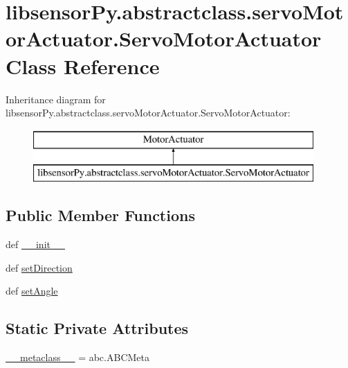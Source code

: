 \hypertarget{classlibsensorPy_1_1abstractclass_1_1servoMotorActuator_1_1ServoMotorActuator}{}\section{libsensor\+Py.\+abstractclass.\+servo\+Motor\+Actuator.\+Servo\+Motor\+Actuator Class Reference}
\label{classlibsensorPy_1_1abstractclass_1_1servoMotorActuator_1_1ServoMotorActuator}
Inheritance diagram for libsensor\+Py.\+abstractclass.\+servo\+Motor\+Actuator.\+Servo\+Motor\+Actuator\+:\begin{figure}[H]
\begin{center}
\leavevmode
\includegraphics[height=2.000000cm]{classlibsensorPy_1_1abstractclass_1_1servoMotorActuator_1_1ServoMotorActuator}
\end{center}
\end{figure}
\subsection*{Public Member Functions}
\begin{DoxyCompactItemize}
\item 
def \hyperlink{classlibsensorPy_1_1abstractclass_1_1servoMotorActuator_1_1ServoMotorActuator_aa278c980bc2a57f6a34b3dbe092fbe4e}{\+\_\+\+\_\+init\+\_\+\+\_\+}
\item 
def \hyperlink{classlibsensorPy_1_1abstractclass_1_1servoMotorActuator_1_1ServoMotorActuator_acf4917efeaa8ec5531dce41547d81560}{set\+Direction}
\item 
def \hyperlink{classlibsensorPy_1_1abstractclass_1_1servoMotorActuator_1_1ServoMotorActuator_a7d484d442f41ce4584cf89e0b3749a3e}{set\+Angle}
\end{DoxyCompactItemize}
\subsection*{Static Private Attributes}
\begin{DoxyCompactItemize}
\item 
\hyperlink{classlibsensorPy_1_1abstractclass_1_1servoMotorActuator_1_1ServoMotorActuator_ac6eccff424838f355e683c6323415be0}{\+\_\+\+\_\+metaclass\+\_\+\+\_\+} = abc.\+A\+B\+C\+Meta
\end{DoxyCompactItemize}


